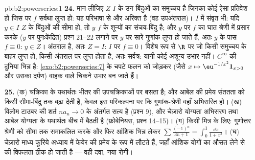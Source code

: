\begin{solution}{pb:b2:powerseries:1}
\textbf{24.} मान लीजिए $Z$ $I$ के उन बिंदुओं का समुच्चय है जिनका कोई ऐसा
प्रतिवेश हो जिस पर $f$ सर्वथा लुप्त हो: यह परिभाषा से  और अरिक्त है
(वह उपअंतराल)। $I$ में संवृत भी: यदि $y
\in I$ $Z$ के बिंदुओं की सीमा हो, तो $y$
$f$ के शून्यों का संचय-बिंदु है; और $y$ पर $f$ का घात श्रेणी में प्रसार
करके ($y$ पर पुनःकेंद्रित) प्रश्न 21--22 लगाने पर $y$ पर सारे गुणांक
लुप्त हो जाते हैं, अतः $y$ के पास $f \equiv 0$: $y
\in Z$। अंतराल  है, अतः $Z = I$:
$I$ पर $f \equiv 0$। विशेष रूप से $\R$ पर  जो किसी  समुच्चय के
बाहर लुप्त हो, किसी अंतराल पर लुप्त होता है, अतः सर्वत्र: यानी कोई अशून्य
 उभार नहीं। $C^\infty$ की दुनिया भिन्न है: \cref{exo:b2:powerseries:7} के चपटे फलन को जोड़कर
(जैसे $x \mapsto
\eu^{-1/x^2}\mathbf 1_{x>0}$ और उसका दर्पण)  वाहक वाले चिकने उभार बन जाते हैं।

\textbf{25.} (क)  चक्रिका के यथार्थतः भीतर की 
उपचक्रिकाओं पर बसता है; और आबेल की प्रमेय संततता को किसी सीमा-बिंदु तक
बढ़ा देती है, केवल इस परिकल्पना पर कि गुणांक-श्रेणी वहाँ अभिसरित हो। (ख)
विलोम टाउबर की शर्त $na_n \to 0$ के अंतर्गत सत्य है (प्रश्न 9), और चेज़ारो योग्यता
अभिसरण तथा आबेल योग्यता के यथार्थतः बीच में बैठती है (फ्रोबेनियस, प्रश्न
14--15)। (ग) किसी मित्र के लिए: गुणोत्तर श्रेणी को सीमा तक समाकलित करके
और फिर आंशिक भिन्न लेकर $\sum\frac{(-1)^n}{3n+1} = \int_0^1\frac{\dd x}{1+x^3}$। (घ) चेज़ारो माध्य फूरिये अध्याय में फेयेर की
प्रमेय के रूप में लौटते हैं, जहाँ आंशिक योगों का औसत लेने से  की विफलता ठीक हो जाती है --- वही दवा, नया रोगी।
\end{solution}
